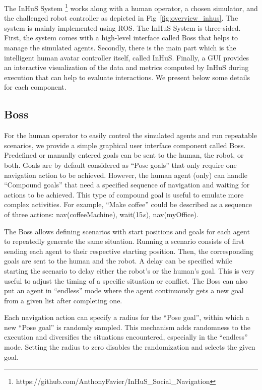 The InHuS System%
\footnote{https://github.com/AnthonyFavier/InHuS\_Social\_Navigation}
works along with a human operator, a chosen simulator, and the challenged robot controller as depicted in Fig~\ref{fig:overview_inhus}. The system is mainly implemented using ROS. The InHuS  System is three-sided. First, the system comes with a high-level interface called Boss that helps to manage the simulated agents. Secondly, there is the main part which is the intelligent human avatar controller itself, called InHuS.
Finally, a GUI provides an interactive visualization of the data and metrics computed by InHuS during execution that can help to evaluate interactions. We present below some details for each component.


\subsection{Boss}
For the human operator to easily control the simulated agents and run repeatable scenarios, we provide a simple graphical user interface component called Boss. Predefined or manually entered goals can be sent to the human, the robot, or both. Goals are by default considered as ``Pose goals'' that only require one navigation action to be achieved. However, the human agent (only) can handle ``Compound goals'' that need a specified sequence of navigation and waiting for actions to be achieved. This type of compound goal is useful to emulate more complex activities. For example, ``Make coffee'' could be described as a sequence of three actions: nav(coffeeMachine), wait(15$s$), nav(myOffice).

The Boss allows defining scenarios with start positions and goals for each agent to repeatedly generate the same situation. 
Running a scenario consists of first sending each agent to their respective starting position. Then, the corresponding goals are sent to the human and the robot.
A delay can be specified while starting the scenario to delay either the robot's or the human's goal. This is very useful to adjust the timing of a specific situation or conflict. The Boss can also put an agent in ``endless'' mode where the agent continuously gets a new goal from a given list after completing one. 

Each navigation action can specify a radius for the ``Pose goal'', within which a new ``Pose goal'' is randomly sampled. This mechanism adds randomness to the execution and diversifies the situations encountered, especially in the ``endless'' mode. Setting the radius to zero disables the randomization and selects the given goal.

